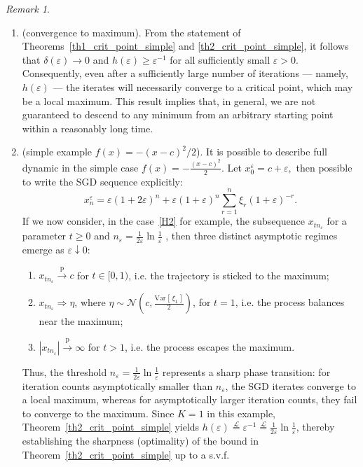 \documentclass{article}
\theoremstyle{plain}
\theoremstyle{definition}
\theoremstyle{remark}
\newtheorem{remark}[theorem]{Remark}
\newcommand{\var}[2][]{{\mathrm{Var}_{#1}\left[ \, #2 \,\right] }} %
\newcommand{\pra}{ \overset{\mathrm{p}}{\longrightarrow}} %
\newcommand{\wra}{ \Rightarrow} %
\begin{document}
\begin{remark}\label{rem_crit_point}
\begin{enumerate}
\item (convergence to maximum). 
From the statement of  Theorems~\ref{th1_crit_point_simple} and \ref{th2_crit_point_simple}, it follows that \(\delta(\varepsilon) \to 0\) and \(h(\varepsilon) \geq \varepsilon^{-1}\) for all sufficiently small \(\varepsilon > 0\). Consequently, even after a sufficiently large number of iterations — namely, \(h(\varepsilon)\) — the iterates will necessarily converge to a critical point, which may be a local maximum. This result implies that, in general, we are not guaranteed to descend to any minimum from an arbitrary starting point within a reasonably long time.


\item (simple example $f(x) = -(x-c)^2/2$). It is possible to describe full dynamic in the simple case $f(x) = -\frac{(x-c)^2}{2}$. Let  $x_0^{\varepsilon} = c+ \varepsilon,$ then possible to write the SGD sequence explicitly:
\begin{equation*}
x_n^{\varepsilon}  = \varepsilon(1+2\varepsilon)^n +  \varepsilon(1+\varepsilon)^n\sum_{r=1}^n\xi_r(1+\varepsilon)^{-r}.
\end{equation*}
%
If we now consider, in the case~\ref{H2} for example, the subsequence \( x_{t n_{\varepsilon}} \) for  a parameter \( t \geq 0 \) and  \(n_{\varepsilon} =  \frac{1}{2\varepsilon} \ln \frac{1}{\varepsilon}\) , then three distinct asymptotic regimes emerge as \( \varepsilon \downarrow 0 \):
%
\begin{enumerate}
    \item \( x_{t n_{\varepsilon}} \pra c \) for \( t \in [0, 1) \), i.e. the trajectory is sticked to the maximum;
    
    \item \( x_{t n_{\varepsilon}} \wra  \eta \), where \( \eta \sim \mathcal{N}\!\left(c, \frac{ \var{\xi_1}}{2}\right) \), for \( t = 1 \), i.e. the process balances near the maximum;
    
    \item \( \left|x_{t n_{\varepsilon}}\right| \pra \infty \) for \( t > 1 \),   i.e. the process  escapes the maximum.
\end{enumerate}
%
Thus, the threshold $n_{\varepsilon} = \frac{1}{2\varepsilon} \ln \frac{1}{\varepsilon}$ represents a sharp phase transition: for iteration counts asymptotically smaller than $n_{\varepsilon}$, the SGD iterates converge to a local maximum, whereas for asymptotically larger iteration counts, they fail to converge to the maximum. Since $K=1$ in this example, Theorem~\ref{th2_crit_point_simple} yields $h(\varepsilon)  \overset{\mathcal{L}}{=}   \varepsilon^{-1}  \overset{\mathcal{L}}{=}   \frac{1}{2\varepsilon} \ln \frac{1}{\varepsilon}$, thereby establishing the sharpness (optimality) of the bound in Theorem~\ref{th2_crit_point_simple} up to a s.v.f.



\end{enumerate}
\end{remark}
\end{document}
